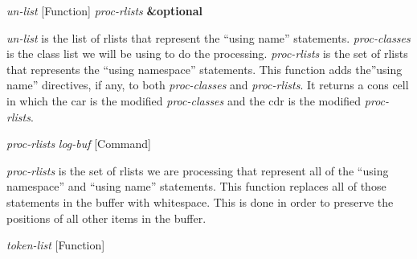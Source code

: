 \vspace{1em}
\noindent
{}
\usebox{\funcname}\emph{un-list}
 \hfill [Function]
\hspace*{\wd\funcname}\emph{proc-rlists}
\hspace*{\wd\funcname}\textbf{\&optional}
\hspace*{\wd\funcname}

\begin{doc-string}
\emph{un-list} is the list of rlists that represent the ``using name'' statements.
\emph{proc-classes} is the class list we will be using to do the processing.
\emph{proc-rlists} is the set of rlists that represents the ``using namespace''
statements.  This function adds the''using name'' directives, if any, to both
\emph{proc-classes} and \emph{proc-rlists}.  It returns a cons cell in which the car is the
modified \emph{proc-classes} and the cdr is the modified \emph{proc-rlists}.
\end{doc-string}

\vspace{1em}
\noindent
{}
\usebox{\funcname}\emph{proc-rlists} \emph{log-buf}
 \hfill [Command]

\begin{doc-string}
\emph{proc-rlists} is the set of rlists we are processing that represent all of the
``using namespace'' and ``using name'' statements.  This function replaces all
of those statements in the buffer with whitespace.  This is done in order to
preserve the positions of all other items in the buffer.
\end{doc-string}

\vspace{1em}
\noindent
{}
\usebox{\funcname}\emph{token-list}
 \hfill [Function]
\hspace*{\wd\funcname}

